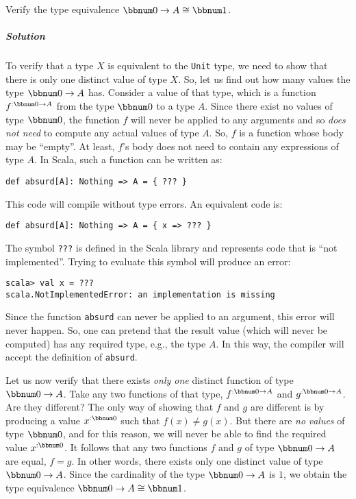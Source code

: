 Verify the type equivalence $\bbnum 0\rightarrow A\cong\bbnum 1$.

\subparagraph{Solution}

To verify that a type $X$ is equivalent to the \lstinline!Unit!
type, we need to show that there is only one distinct value of type
$X$. So, let us find out how many values the type $\bbnum 0\rightarrow A$
has. Consider a value of that type, which is a function $f^{:\bbnum 0\rightarrow A}$
from the type $\bbnum 0$ to a type $A$. Since there exist no values
of type $\bbnum 0$, the function $f$ will never be applied to any
arguments and so \emph{does not need} to compute any actual values
of type $A$. So, $f$ is a function whose body may be \textsf{``}empty\textsf{''}.
At least, $f$\textsf{'}s body does not need to contain any expressions of
type $A$. In Scala, such a function can be written as:
\begin{lstlisting}
def absurd[A]: Nothing => A = { ??? }
\end{lstlisting}
This code will compile without type errors. An equivalent code is:
\begin{lstlisting}
def absurd[A]: Nothing => A = { x => ??? }
\end{lstlisting}
The symbol \lstinline!???! is defined in the Scala library and represents
code that is \textsf{``}not implemented\textsf{''}. Trying to evaluate this symbol
will produce an error:
\begin{lstlisting}
scala> val x = ???
scala.NotImplementedError: an implementation is missing
\end{lstlisting}
Since the function \lstinline!absurd! can never be applied to an
argument, this error will never happen. So, one can pretend that the
result value (which will never be computed) has any required type,
e.g., the type $A$. In this way, the compiler will accept the definition
of \lstinline!absurd!.

Let us now verify that there exists \emph{only one} distinct function
of type $\bbnum 0\rightarrow A$. Take any two functions of that type,
$f^{:\bbnum 0\rightarrow A}$ and $g^{:\bbnum 0\rightarrow A}$. Are
they different? The only way of showing that $f$ and $g$ are different
is by producing a value $x^{:\bbnum 0}$ such that $f(x)\neq g(x)$.
But there are \emph{no} \emph{values} of type $\bbnum 0$, and for
this reason, we will never be able to find the required value $x^{:\bbnum 0}$.
It follows that any two functions $f$ and $g$ of type $\bbnum 0\rightarrow A$
are equal, $f=g$. In other words, there exists only one distinct
value of type $\bbnum 0\rightarrow A$. Since the cardinality of the
type $\bbnum 0\rightarrow A$ is $1$, we obtain the type equivalence
$\bbnum 0\rightarrow A\cong\bbnum 1$.

